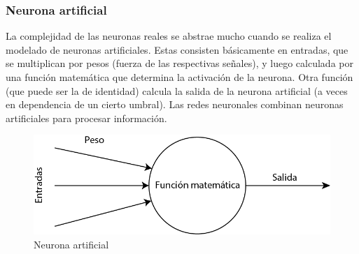 \documentclass[12pt, a4paper, titlepage]{report}
\begin{document}
						\subsubsection*{Neurona artificial}
						La complejidad de las neuronas reales se abstrae mucho cuando se realiza el modelado de neuronas artificiales. Estas consisten básicamente en entradas, que se multiplican por pesos (fuerza de las respectivas señales), y luego calculada por una función matemática que determina la activación de la neurona. Otra función (que puede ser la de identidad) calcula la salida de la neurona artificial (a veces en dependencia de un cierto umbral). Las redes neuronales combinan neuronas artificiales para procesar información.\cite{refNeuronaArt}
						\begin{figure}[H] 
							\includegraphics[width=12cm]{./imagenes/MarcoTeorico/NeuronaArt.png}
							\centering 
							\caption{Neurona artificial}
						\end{figure}
\end{document}
